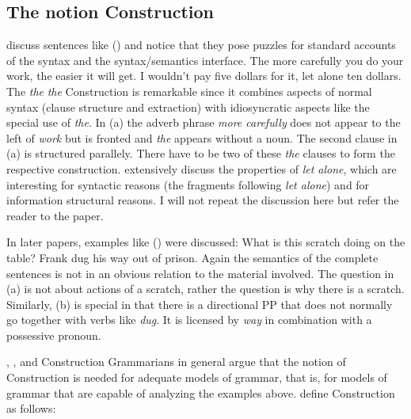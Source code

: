 \documentclass[output=paper]{langsci/langscibook}
\begin{document}
\subsection{The notion Construction}
\label{sec-def-construction}

\citet*{FKoC88a} discuss sentences like () and notice that they pose puzzles for standard
accounts of the syntax and the syntax/semantics interface. 
\eal
\ex The more carefully you do your work, the easier it will get.
\ex I wouldn't pay five dollars for it, let alone ten dollars.
\zl
The \emph{the}  \emph{the}  Construction is remarkable since it combines aspects of normal syntax
(clause structure and extraction) with idiosyncratic aspects like the special use of
\emph{the}. In (a) the adverb phrase \emph{more carefully} does not appear to the left of
\emph{work} but is fronted and \emph{the} appears without a noun. The second clause in (a) is structured
parallely. There have to be two of these \emph{the} clauses to form the respective
construction. \citet*{FKoC88a} extensively discuss the properties of \emph{let alone}, which are
interesting for syntactic reasons (the fragments following \emph{let alone}) and for information
structural reasons. I will not repeat the discussion here but refer the reader to the paper.

In later papers, examples like () were discussed:
\eal
\ex What is this scratch doing on the table? \hfill\citep[]{KF99a}
\ex Frank dug his way out of prison. \hfill\citep[]{Goldberg95a}
\zl
Again the semantics of the complete sentences is not in an obvious relation to the material
involved. The question in (a) is not about actions of a scratch, rather the question is why
there is a scratch. Similarly, (b) is special in that there is a directional PP that does not
normally go together with verbs like \emph{dug}. It is licensed by \emph{way} in combination with a
possessive pronoun.

\citet{FKoC88a}, \citet{Goldberg95a}, \citet{KF99a} and Construction Grammarians in general argue
that the notion of Construction is needed for adequate models of grammar, that is, for models of
grammar that are capable of analyzing the examples above. \citet[]{FKoC88a} define
Construction as follows: 
\end{document}
